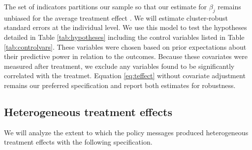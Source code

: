 \documentclass[11pt, a4paper]{article}\usepackage[]{graphicx}\usepackage[]{color}
\begin{document}
        The set of indicators partitions our sample so that our estimate for $\beta_j$ remains unbiased for the average treatment effect \parencite{lin_agnostic_2013}. We will estimate cluster-robust standard errors at the individual level. We use this model to test the hypotheses detailed in Table \ref{tab:hypotheses} including the control variables listed in Table \ref{tab:controlvars}. These variables were chosen based on prior expectations about their predictive power in relation to the outcomes. Because these covariates were measured after treatment, we exclude any variables found to be significantly correlated with the treatmet. Equation \ref{eq:teffect} without covariate adjustment remains our preferred specification and report both estimates for robustness.

        \begin{table}[h]
        \centering
        \caption{Control variables for covariate adjustment}
        \label{tab:controlvars}
        \end{table}

    \subsection{Heterogeneous treatment effects}

        We will analyze the extent to which the policy messages produced heterogeneous treatment effects with the following specification.
\end{document}
